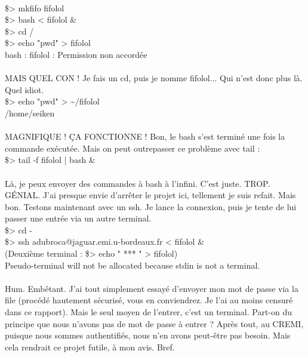 \\\$> mkfifo fifolol
\\\$> bash < fifolol \&
\\\$> cd /
\\\$> echo "pwd" > fifolol
\\bash : fifolol : Permission non accordée
\\\\
MAIS QUEL CON ! Je fais un cd, puis je nomme fifolol... Qui n'est donc plus là. Quel idiot.
\\\$> echo "pwd" > \textasciitilde/fifolol
\\/home/seiken
\\\\
MAGNIFIQUE ! ÇA FONCTIONNE ! Bon, le bash s'est terminé une fois la commande exécutée. Mais on peut outrepasser ce problème avec tail :
\\\$> tail -f fifolol | bash \&
\\\\
Là, je peux envoyer des commandes à bash à l'infini. C'est juste. TROP. GÉNIAL. J'ai presque envie d'arrêter le projet ici, tellement je suis refait. Mais bon. Testons maintenant avec un ssh. Je lance la connexion, puis je tente de lui passer une entrée via un autre terminal.
\\\$> cd -
\\\$> ssh adubroca@jaguar.emi.u-bordeaux.fr < fifolol \&
\\(Deuxième terminal : \$> echo " *** " > fifolol)
\\Pseudo-terminal will not be allocated because stdin is not a terminal.
\\\\
Hum. Embêtant. J'ai tout simplement essayé d'envoyer mon mot de passe via la file (procédé hautement sécurisé, vous en conviendrez. Je l'ai au moins censuré dans ce rapport). Mais le seul moyen de l'entrer, c'est un terminal. Part-on du principe que nous n'avons pas de mot de passe à entrer ? Après tout, au CREMI, puisque nous sommes authentifiés, nous n'en avons peut-être pas besoin. Mais cela rendrait ce projet futile, à mon avis. Bref.